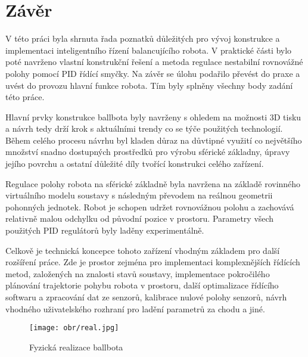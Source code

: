 \newpage

\chapter{Závěr}
\label{zaver}

V této práci byla shrnuta řada poznatků důležitých pro vývoj konstrukce a implementaci inteligentního řízení balancujícího robota. V praktické části bylo poté navrženo vlastní konstrukční řešení a metoda regulace nestabilní rovnovážné polohy pomocí PID řídící smyčky. Na závěr se úlohu podařilo převést do praxe a uvést do provozu hlavní funkce robota. Tím byly splněny všechny body zadání této práce.

Hlavní prvky konstrukce ballbota byly navrženy s ohledem na možnosti 3D tisku a návrh tedy drží krok s aktuálními trendy co se týče použitých technologií. Během celého procesu návrhu byl kladen důraz na důvtipné využití co největšího množství snadno dostupných prostředků pro výrobu sférické základny, úpravy jejího povrchu a ostatní důležité díly tvořící konstrukci celého zařízení.

Regulace polohy robota na sférické základně byla navržena na základě rovinného virtuálního modelu soustavy s následným převodem na reálnou geometrii pohonných jednotek. Robot je schopen udržet rovnovážnou polohu a zachovává relativně malou odchylku od původní pozice v prostoru. Parametry všech použitých PID regulátorů byly laděny experimentálně.

Celkově je technická koncepce tohoto zařízení vhodným základem pro další rozšíření práce. Zde je prostor zejména pro implementaci komplexnějších řídících metod, založených na znalosti stavů soustavy, implementace pokročilého plánování trajektorie pohybu robota v prostoru, další optimalizace řídícího softwaru a zpracování dat ze senzorů, kalibrace nulové polohy senzorů, návrh vhodného uživatelského rozhraní pro ladění parametrů za chodu a jiné.
\vspace{7mm}
\begin{figure}[htb]
\begin{center}
\texttt{[image: obr/real.jpg]}
\end{center}
\vspace{5mm}
\caption{Fyzická realizace ballbota}
\label{real}
\end{figure}
